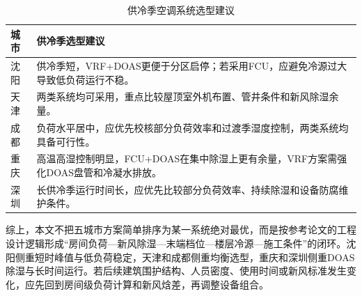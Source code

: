\begin{table}[!htbp]
\centering
\caption{供冷季空调系统选型建议}
\label{tab:decision}
\begin{tabular}{@{}lp{10.0cm}@{}}
\toprule
城市 & 供冷季选型建议 \\
\midrule
沈阳 & 供冷季短，VRF+DOAS更便于分区启停；若采用FCU，应避免冷源过大导致低负荷运行不稳。 \\
天津 & 两类系统均可采用，重点比较屋顶室外机布置、管井条件和新风除湿余量。 \\
成都 & 负荷水平居中，应优先校核部分负荷效率和过渡季湿度控制，两类系统均具备可行性。 \\
重庆 & 高温高湿控制明显，FCU+DOAS在集中除湿上更有余量，VRF方案需强化DOAS盘管和冷凝水排放。 \\
深圳 & 长供冷季运行时间长，应优先比较部分负荷效率、持续除湿和设备防腐维护条件。 \\
\bottomrule
\end{tabular}
\end{table}

综上，本文不把五城市方案简单排序为某一系统绝对最优，而是按参考论文的工程设计逻辑形成“房间负荷—新风除湿—末端档位—楼层冷源—施工条件”的闭环。沈阳侧重短时峰值与低负荷稳定，天津和成都侧重均衡选型，重庆和深圳侧重DOAS除湿与长时间运行。若后续建筑围护结构、人员密度、使用时间或新风标准发生变化，应先回到房间级负荷计算和新风焓差，再调整设备组合。
